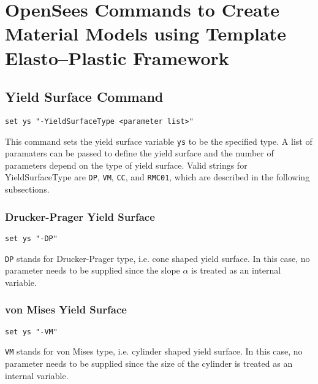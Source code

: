 \section{OpenSees Commands to Create Material Models using Template Elasto--Plastic Framework}
\label{EPTemplate_commands}




\subsection{Yield Surface Command}
\label{YS_Command}

\begin{verbatim}
set ys "-YieldSurfaceType <parameter list>"
\end{verbatim}

This  command sets the yield surface variable \texttt{ys} to be
the  specified  type.  A  list  of  paramaters can be passed to
define the yield surface and the number of parameters depend on
the  type  of yield surface. Valid strings for YieldSurfaceType
are \texttt{DP}, \texttt{VM}, \texttt{CC}, and \texttt{RMC01},  
which  are described in the following subsections.

\subsubsection{Drucker-Prager Yield Surface} 
\label{dp_ys}
\begin{verbatim}
set ys "-DP"
\end{verbatim}

\texttt{DP}  stands  for  Drucker-Prager type, i.e. cone shaped
yield  surface. In this case, no parameter needs to be supplied
since the slope $\alpha$ is treated as an internal variable.

\subsubsection{von Mises Yield Surface} 
\label{vm_ys}
\begin{verbatim}
set ys "-VM"
\end{verbatim}

\texttt{VM}  stands  for  von  Mises type, i.e. cylinder shaped
yield  surface. In this case, no parameter needs to be supplied
since  the  size  of  the  cylinder  is  treated as an internal
variable.

